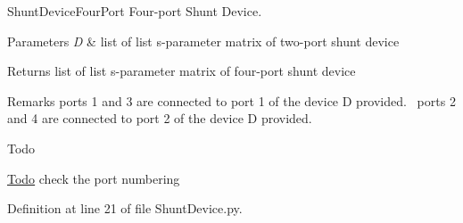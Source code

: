 Shunt\+Device\+Four\+Port Four-\/port Shunt Device. 


\begin{DoxyParams}{Parameters}
{\em D} & list of list s-\/parameter matrix of two-\/port shunt device \\
\hline
\end{DoxyParams}
\begin{DoxyReturn}{Returns}
list of list s-\/parameter matrix of four-\/port shunt device 
\end{DoxyReturn}
\begin{DoxyRemark}{Remarks}
ports 1 and 3 are connected to port 1 of the device D provided.~\newline
 ports 2 and 4 are connected to port 2 of the device D provided.~\newline

\end{DoxyRemark}
\begin{DoxyRefDesc}{Todo}
\item[\hyperlink{todo__todo000004}{Todo}]check the port numbering \end{DoxyRefDesc}


Definition at line 21 of file Shunt\+Device.\+py.

